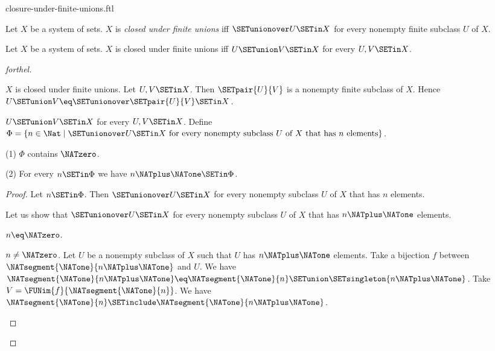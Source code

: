 \documentclass{naproche-library}
\begin{document}
\begin{smodule}[title=Closure Under Finite Unions]{closure-under-finite-unions.ftl}

\begin{definition}[forthel,id=FOUNDATIONS_14_7040118193913856]
  Let $X$ be a system of sets.
  $X$ is \emph{closed under finite unions} iff $\SETunionover U \SETin X$ for every nonempty finite subclass $U$ of $X$.
\end{definition}

\begin{proposition}[forthel,id=FOUNDATIONS_17_4164024962908160]
  Let $X$ be a system of sets.
  $X$ is closed under finite unions iff $U \SETunion V \SETin X$ for every $U, V \SETin X$.
\end{proposition}
\begin{proof}[forthel]
  \begin{case}{$X$ is closed under finite unions.}
    Let $U, V \SETin X$.
    Then $\SETpair{U}{V}$ is a nonempty finite subclass of $X$.
    Hence $U \SETunion V \eq \SETunionover \SETpair{U}{V} \SETin X$.
  \end{case}

  \begin{case}{$U \SETunion V \SETin X$ for every $U, V \SETin X$.}
    Define $\Phi = \{ n \in \Nat \mid \SETunionover U \SETin X\text{ for every nonempty subclass }U\text{ of }X\text{ that has }n\text{ elements}\}$.

    (1) $\Phi$ contains $\NATzero$.

    (2) For every $n \SETin \Phi$ we have $n \NATplus \NATone \SETin \Phi$.
    \begin{proof}
      Let $n \SETin \Phi$.
      Then $\SETunionover U \SETin X$ for every nonempty subclass $U$ of $X$ that has $n$ elements.

      Let us show that $\SETunionover U \SETin X$ for every nonempty subclass $U$ of $X$ that has $n \NATplus \NATone$ elements.

        \begin{case}{$n \eq \NATzero$.} \end{case}

        \begin{case}{$n \neq \NATzero$.}
          Let $U$ be a nonempty subclass of $X$ such that $U$ has $n \NATplus \NATone$ elements.
          Take a bijection $f$ between $\NATsegment{\NATone}{n \NATplus \NATone}$ and $U$.
          We have $\NATsegment{\NATone}{n \NATplus \NATone} \eq \NATsegment{\NATone}{n} \SETunion \SETsingleton{n \NATplus \NATone}$.
          Take $V = \FUNim{f}{\NATsegment{\NATone}{n}}$.
          We have $\NATsegment{\NATone}{n} \SETinclude \NATsegment{\NATone}{n \NATplus \NATone}$.


\end{case}
\end{proof}
\end{case}
\end{proof}
\end{smodule}
\end{document}
